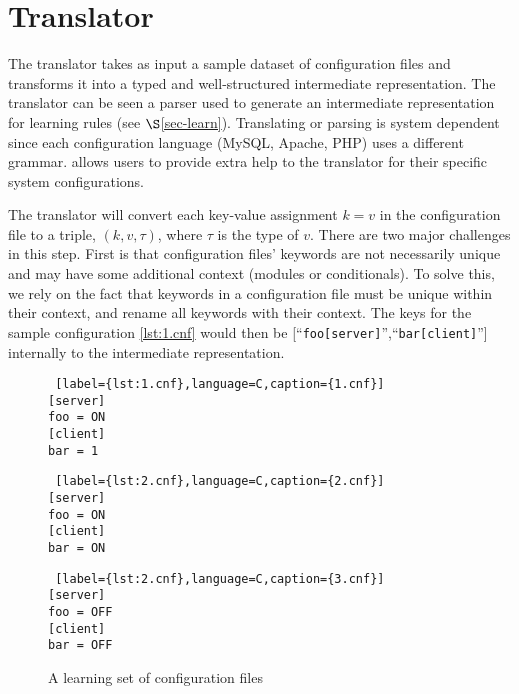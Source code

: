 
\section{Translator}
\label{sec-trans}

The translator takes as input a sample dataset of configuration files and transforms it into a typed and well-structured intermediate representation.
The translator can be seen a parser used to generate an intermediate representation for learning rules (see $\S$\ref{sec-learn}).
Translating or parsing is system dependent since each configuration language (MySQL, Apache, PHP) uses a different grammar.
\app allows users to provide extra help to the translator for their specific system configurations.

The translator will convert each key-value assignment $k=v$ in the configuration file to a triple, $(k, v, \tau)$, where $\tau$ is the type of $v$. 
There are two major challenges in this step.
First is that configuration files' keywords are not necessarily unique and may have some additional context (modules or conditionals).
To solve this, we rely on the fact that keywords in a configuration file must be unique within their context, and rename all keywords with their context.
The keys for the sample configuration \ref{lst:1.cnf} would then be [``{\tt foo[server]}'',``{\tt bar[client]}''] internally to the intermediate representation.


\begin{figure}[!htb]
    \centering
    \begin{minipage}{.25\textwidth}
	\begin{lstlisting} [label={lst:1.cnf},language=C,caption={1.cnf}]
[server]
foo = ON
[client]
bar = 1
	\end{lstlisting}
    \end{minipage}%
    \hspace{1cm}
    \begin{minipage}{0.25\textwidth}
	\begin{lstlisting} [label={lst:2.cnf},language=C,caption={2.cnf}]
[server]
foo = ON
[client]
bar = ON
	\end{lstlisting}
    \end{minipage}
    \hspace{1cm}
    \begin{minipage}{0.25\textwidth}
	\begin{lstlisting} [label={lst:2.cnf},language=C,caption={3.cnf}]
[server]
foo = OFF
[client]
bar = OFF
	\end{lstlisting}
    \end{minipage}

    \caption{A learning set of configuration files}
\end{figure}


